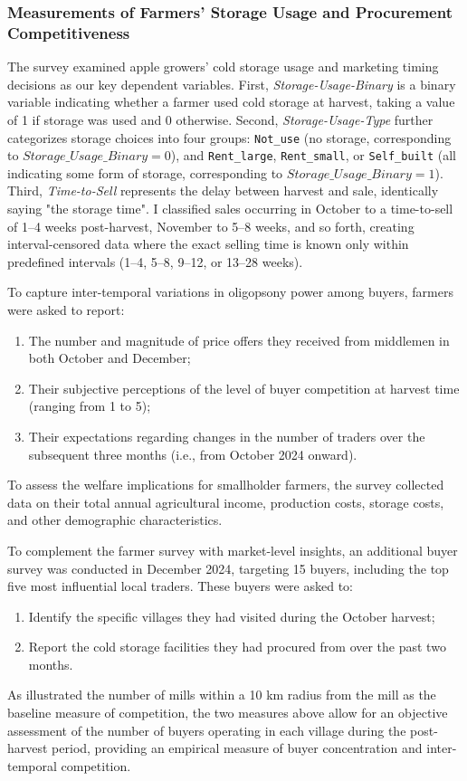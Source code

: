 \documentclass[12pt]{article}
\begin{document}
\subsubsection{Measurements of Farmers' Storage Usage and Procurement Competitiveness}
\noindent The survey examined apple growers' cold storage usage and marketing timing decisions as our key dependent variables. First, \textit{Storage-Usage-Binary} is a binary variable indicating whether a farmer used cold storage at harvest, taking a value of 1 if storage was used and 0 otherwise. Second, \textit{Storage-Usage-Type} further categorizes storage choices into four groups: \texttt{Not\_use} (no storage, corresponding to $Storage\_Usage\_Binary = 0$), and \texttt{Rent\_large}, \texttt{Rent\_small}, or \texttt{Self\_built} (all indicating some form of storage, corresponding to $Storage\_Usage\_Binary = 1$). Third, \textit{Time-to-Sell} represents the delay between harvest and sale, identically saying "the storage time". I classified sales occurring in October to a time-to-sell of 1--4 weeks post-harvest, November to 5--8 weeks, and so forth, creating interval-censored data where the exact selling time is known only within predefined intervals (1--4, 5--8, 9--12, or 13--28 weeks). 

To capture inter-temporal variations in oligopsony power among buyers, farmers were asked to report:
\begin{enumerate}
    \item The number and magnitude of price offers they received from middlemen in both October and December;
    \item Their subjective perceptions of the level of buyer competition at harvest time (ranging from 1 to 5);
    \item Their expectations regarding changes in the number of traders over the subsequent three months (i.e., from October 2024 onward).
\end{enumerate}

To assess the welfare implications for smallholder farmers, the survey collected data on their total annual agricultural income, production costs, storage costs, and other demographic characteristics.

To complement the farmer survey with market-level insights, an additional buyer survey was conducted in December 2024, targeting 15 buyers, including the top five most influential local traders. These buyers were asked to:
\begin{enumerate}
    \item Identify the specific villages they had visited during the October harvest;
    \item Report the cold storage facilities they had procured from over the past two months.
\end{enumerate}
As \cite{macchiavello2021competition} illustrated the number of mills within a 10 km radius from the mill as the baseline measure of competition, the two measures above allow for an objective assessment of the number of buyers operating in each village during the post-harvest period, providing an empirical measure of buyer concentration and inter-temporal competition.
\end{document}
